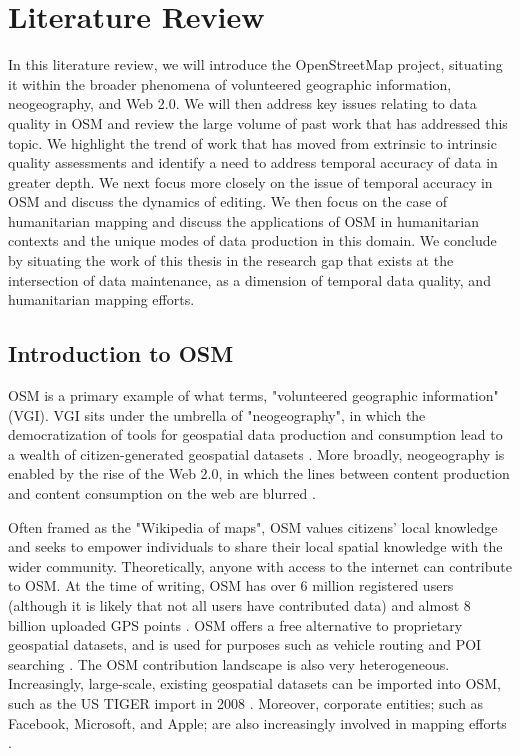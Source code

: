 \chapter{Literature Review}
\label{chapterlabel2}

In this literature review, we will introduce the OpenStreetMap project, situating it within the broader phenomena of volunteered geographic information, neogeography, and Web 2.0. We will then address key issues relating to data quality in OSM and review the large volume of past work that has addressed this topic. We highlight the trend of work that has moved from extrinsic to intrinsic quality assessments and identify a need to address temporal accuracy of data in greater depth. We next focus more closely on the issue of temporal accuracy in OSM and discuss the dynamics of editing. We then focus on the case of humanitarian mapping and discuss the applications of OSM in humanitarian contexts and the unique modes of data production in this domain. We conclude by situating the work of this thesis in the research gap that exists at the intersection of data maintenance, as a dimension of temporal data quality, and humanitarian mapping efforts. 

\section{Introduction to OSM}

OSM is a primary example of what \textcite{goodchild_citizens_2007} terms, "volunteered geographic information" (VGI). VGI sits under the umbrella of "neogeography", in which the democratization of tools for geospatial data production and consumption lead to a wealth of citizen-generated geospatial datasets \parencite{goodchild_neogeography_2009, haklay_web_2008}. More broadly, neogeography is enabled by the rise of the Web 2.0, in which the lines between content production and content consumption on the web are blurred \parencite{oreilly_what_2009}. 

Often framed as the "Wikipedia of maps", OSM values citizens' local knowledge and seeks to empower individuals to share their local spatial knowledge with the wider community. Theoretically, anyone with access to the internet can contribute to OSM. At the time of writing, OSM has over 6 million registered users (although it is likely that not all users have contributed data) and almost 8 billion uploaded GPS points \parencite{noauthor_openstreetmap_2020}. OSM offers a free alternative to proprietary geospatial datasets, and is used for purposes such as vehicle routing \parencite{graser_is_2015, luxen_real-time_2011} and POI searching \parencite{ruta_indooroutdoor_2015}. The OSM contribution landscape is also very heterogeneous. Increasingly, large-scale, existing geospatial datasets can be imported into OSM, such as the US TIGER import in 2008 \parencite{zielstra_assessing_2013}. Moreover, corporate entities; such as Facebook, Microsoft, and Apple; are also increasingly involved in mapping efforts \parencite{anderson_corporate_2019}.

